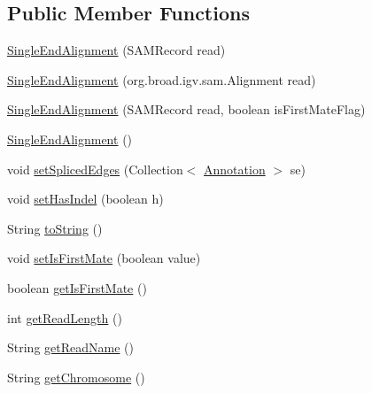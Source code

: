 \subsection*{Public Member Functions}
\begin{DoxyCompactItemize}
\item 
\hyperlink{classumms_1_1core_1_1alignment_1_1_single_end_alignment_af6832ccae2d80001aea1e9fab6d071f1}{Single\+End\+Alignment} (S\+A\+M\+Record read)
\item 
\hyperlink{classumms_1_1core_1_1alignment_1_1_single_end_alignment_aa4d673dd26af3db4a7b551487f774075}{Single\+End\+Alignment} (org.\+broad.\+igv.\+sam.\+Alignment read)
\item 
\hyperlink{classumms_1_1core_1_1alignment_1_1_single_end_alignment_a8bf08051254bd536e1a05b62993b85f5}{Single\+End\+Alignment} (S\+A\+M\+Record read, boolean is\+First\+Mate\+Flag)
\item 
\hyperlink{classumms_1_1core_1_1alignment_1_1_single_end_alignment_a6de5322355392f9819a9801b48656cf9}{Single\+End\+Alignment} ()
\item 
void \hyperlink{classumms_1_1core_1_1alignment_1_1_single_end_alignment_aede37af502c66fb974ebeb31e4634bdf}{set\+Spliced\+Edges} (Collection$<$ \hyperlink{interfaceumms_1_1core_1_1annotation_1_1_annotation}{Annotation} $>$ se)
\item 
void \hyperlink{classumms_1_1core_1_1alignment_1_1_single_end_alignment_add0609ad85691794579b5d73a6e240ae}{set\+Has\+Indel} (boolean h)
\item 
String \hyperlink{classumms_1_1core_1_1alignment_1_1_single_end_alignment_a6d27a1e3d0be764ed75ee0e57c19def9}{to\+String} ()
\item 
void \hyperlink{classumms_1_1core_1_1alignment_1_1_single_end_alignment_a97f8020bc3d1457584313a0405e2f766}{set\+Is\+First\+Mate} (boolean value)
\item 
boolean \hyperlink{classumms_1_1core_1_1alignment_1_1_single_end_alignment_aaebe0666bfb535f6cf60beb167800351}{get\+Is\+First\+Mate} ()
\item 
int \hyperlink{classumms_1_1core_1_1alignment_1_1_single_end_alignment_a7947c9515e3e23e7edf4e16249f3d394}{get\+Read\+Length} ()
\item 
String \hyperlink{classumms_1_1core_1_1alignment_1_1_single_end_alignment_ac1f86f82faccc55aac35209be5901b5b}{get\+Read\+Name} ()
\item 
String \hyperlink{classumms_1_1core_1_1alignment_1_1_single_end_alignment_a739c55573225c24e736b25965ed01251}{get\+Chromosome} ()

\end{DoxyCompactItemize}
